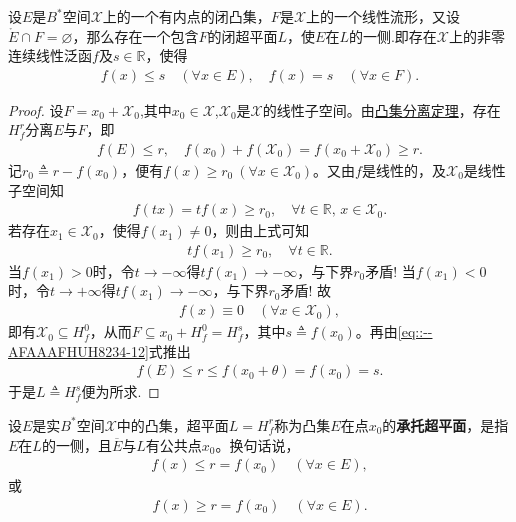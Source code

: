 \documentclass[../../main.tex]{subfiles}%
\begin{document}
\begin{corollary}[Mazur定理]\label{corollary:泛函分析--Mazur定理}
设$E$是$B^*$空间$\mathscr{X}$上的一个有内点的闭凸集，$F$是$\mathscr{X}$上的一个线性流形，又设$\mathring{E} \cap F = \varnothing$，那么存在一个包含$F$的闭超平面$L$，使$E$在$L$的一侧.即存在$\mathscr{X}$上的非零连续线性泛函$f$及$s \in \mathbb{R}$，使得
\begin{align*}
f(x) \leqslant s \quad (\forall x \in E), \quad f(x) = s \quad (\forall x \in F).
\end{align*}
\end{corollary}
\begin{proof}

设$F = x_0 + \mathscr{X}_0$,其中$x_0 \in \mathscr{X}$,$\mathscr{X}_0$是$\mathscr{X}$的线性子空间。由\hyperref[theorem:泛函分析--凸集分离定理]{凸集分离定理}，存在$H_f^r$分离$E$与$F$，即
\begin{align}
f(E)\leqslant r,\quad f\left( x_0 \right) +f\left( \mathscr{X} _0 \right) =f(x_0+\mathscr{X} _0)\geqslant r.
\label{eq::--AFAAAFHUH8234-12}
\end{align}
记$r_0 \triangleq r - f(x_0)$，便有$f(x) \geqslant r_0 \ (\forall x \in \mathscr{X}_0)$。又由$f$是线性的，及$\mathscr{X}_0$是线性子空间知
\begin{align*}
f(tx)=tf(x)\geqslant r_0,\quad \forall t\in\mathbb{R},\,x\in\mathscr{X}_0.
\end{align*}
若存在$x_1\in\mathscr{X}_0$，使得$f(x_1)\ne 0$，则由上式可知
\begin{align*}
tf(x_1)\geqslant r_0,\quad \forall t\in\mathbb{R}.
\end{align*}
当$f(x_1)>0$时，令$t\to-\infty$得$tf(x_1)\to-\infty$，与下界$r_0$矛盾! 当$f(x_1)<0$时，令$t\to+\infty$得$tf(x_1)\to-\infty$，与下界$r_0$矛盾!
故
\begin{align*}
f(x) \equiv 0 \quad (\forall x \in \mathscr{X}_0),
\end{align*}
即有$\mathscr{X}_0 \subseteq H_f^0$，从而$F \subseteq x_0 + H_f^0 = H_f^s$，其中$s \triangleq f(x_0)$。再由\eqref{eq::--AFAAAFHUH8234-12}式推出
\begin{align*}
f(E) \leqslant r\leqslant f(x_0+\theta)=f(x_0)=s.
\end{align*}
于是$L \triangleq H_f^s$便为所求.

\end{proof}

\begin{definition}[承托超平面]
设$E$是实$B^*$空间$\mathscr{X}$中的凸集，超平面$L = H_f^r$称为凸集$E$在点$x_0$的\textbf{承托超平面}，是指$E$在$L$的一侧，且$\overline{E}$与$L$有公共点$x_0$。换句话说，
\begin{align*}
f(x) \leqslant r = f(x_0) \quad (\forall x \in E),
\end{align*}
或
\begin{align*}
f(x) \geqslant r = f(x_0) \quad (\forall x \in E).
\end{align*}
\end{definition}
\end{document}
